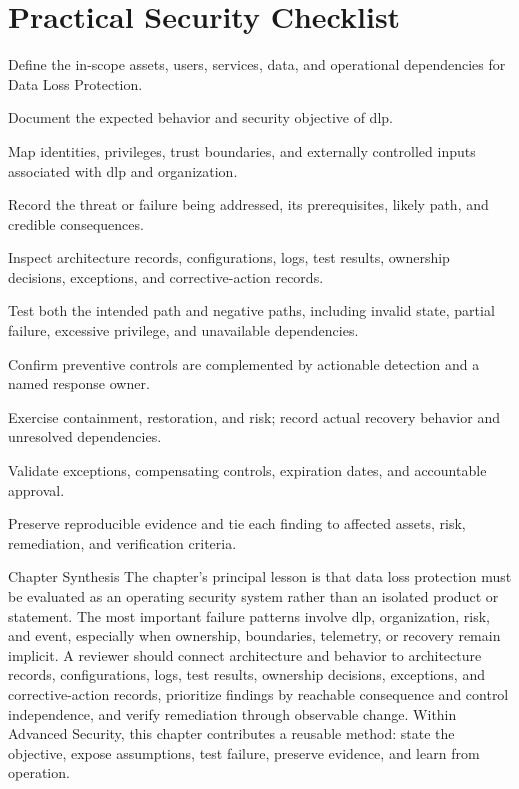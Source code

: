 \documentclass[11pt,letterpaper]{article}
\begin{document}
\section*{Practical Security Checklist}
\begin{CornellChecklist}
\item Define the in-scope assets, users, services, data, and operational dependencies for Data Loss Protection.
\item Document the expected behavior and security objective of dlp.
\item Map identities, privileges, trust boundaries, and externally controlled inputs associated with dlp and organization.
\item Record the threat or failure being addressed, its prerequisites, likely path, and credible consequences.
\item Inspect architecture records, configurations, logs, test results, ownership decisions, exceptions, and corrective-action records.
\item Test both the intended path and negative paths, including invalid state, partial failure, excessive privilege, and unavailable dependencies.
\item Confirm preventive controls are complemented by actionable detection and a named response owner.
\item Exercise containment, restoration, and risk; record actual recovery behavior and unresolved dependencies.
\item Validate exceptions, compensating controls, expiration dates, and accountable approval.
\item Preserve reproducible evidence and tie each finding to affected assets, risk, remediation, and verification criteria.
\end{CornellChecklist}
\begin{CornellSummaryBox}{Chapter Synthesis}
The chapter's principal lesson is that data loss protection must be evaluated as an operating security system rather than an isolated product or statement. The most important failure patterns involve dlp, organization, risk, and event, especially when ownership, boundaries, telemetry, or recovery remain implicit. A reviewer should connect architecture and behavior to architecture records, configurations, logs, test results, ownership decisions, exceptions, and corrective-action records, prioritize findings by reachable consequence and control independence, and verify remediation through observable change. Within Advanced Security, this chapter contributes a reusable method: state the objective, expose assumptions, test failure, preserve evidence, and learn from operation.
\end{CornellSummaryBox}
\end{document}
